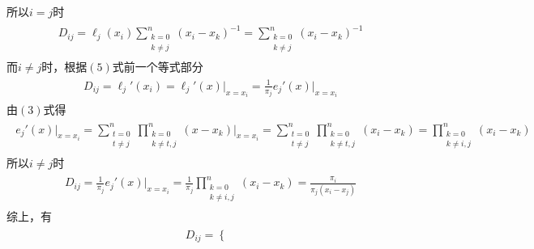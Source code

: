 \documentclass[12pt,a4paper,utf8]{ctexart}
\begin{document}
\begin{enumerate}
\begin{eqnarray}
\begin{aligned}
            \end{aligned}
         \end{eqnarray}
         所以$i = j$时
         \begin{eqnarray}
            \begin{aligned}
               D_{ij}=\ell_j(x_i)\sum_{\substack{k=0 \\ k\neq j}}^{n}(x_i-x_k)^{-1}
               =\sum_{\substack{k=0                  \\ k\neq j}}^{n}(x_i-x_k)^{-1}
            \end{aligned}
         \end{eqnarray}
         而$i \neq j$时，根据$(5)$式前一个等式部分
         \begin{eqnarray}
            \begin{aligned}
               D_{ij}=\ell_j'(x_i)=\ell_j'(x)\Big|_{x=x_i}=\frac{1}{\pi_j}e_j'(x)\Big|_{x=x_i}
            \end{aligned}
         \end{eqnarray}
         由$(3)$式得
         \begin{eqnarray}
            \begin{aligned}
               e_j'(x)\Big|_{x=x_i}=\sum_{\substack{t=0 \\ t\neq j}}^{n}\prod_{\substack{k=0\\k \neq t,j}}^{n}(x-x_k)\Big|_{x=x_i}
               =\sum_{\substack{t=0                     \\ t\neq j}}^{n}\prod_{\substack{k=0\\k \neq t,j}}^{n}(x_i-x_k)
               =\prod_{\substack{k=0                    \\k \neq i,j}}^{n}(x_i-x_k)
            \end{aligned}
         \end{eqnarray}
         所以$i \neq j$时
         \begin{eqnarray}
            \begin{aligned}
               D_{ij}=\frac{1}{\pi_j}e_j'(x)\Big|_{x=x_i}=\frac{1}{\pi_j}\prod_{\substack{k=0 \\k \neq i,j}}^{n}(x_i-x_k)
               =\frac{\pi_i}{\pi_j(x_i-x_j)}
            \end{aligned}
         \end{eqnarray}
         综上，有
         \begin{eqnarray}
            \begin{aligned}
               D_{ij}=
               \begin{cases}

\end{cases}
\end{aligned}
\end{eqnarray}
\end{enumerate}
\end{document}
